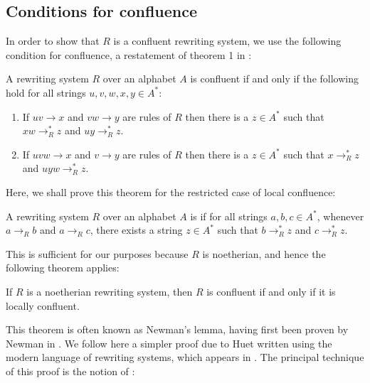 \documentclass[11pt,libertine,widepage,nosubthm]{lmaths}
\begin{document}
\subsection{Conditions for confluence}

In order to show that $R$ is a confluent rewriting system, we use the following condition for confluence, a restatement of theorem 1 in \cite{McNaughton1987}:
\begin{theorem}
	A rewriting system $R$ over an alphabet $A$ is confluent if and only if the following hold for all strings $u, v, w, x, y \in A^*$:
	\begin{enumerate}[(1)]
		\item \label{it:conf-overlap} If $uv \to x$ and $vw \to y$ are rules of $R$ then there is a $z \in A^*$ such that $xw \to^*_R z$ and $uy \to^*_R z$.
		\item \label{it:conf-middle} If $uvw \to x$ and $v \to y$ are rules of $R$ then there is a $z \in A^*$ such that $x \to^*_R z$ and $uyw \to^*_R z$.
	\end{enumerate}
\end{theorem}

Here, we shall prove this theorem for the restricted case of local confluence:

\begin{defn}
	A rewriting system $R$ over an alphabet $A$ is  if for all strings $a, b, c \in A^*$, whenever $a \to_R b$ and $a \to_R c$, there exists a string $z \in A^*$ such that $b \to^*_R z$ and $c \to^*_R z$.
\end{defn}

This is sufficient for our purposes because $R$ is noetherian, and hence the following theorem applies:

\begin{theorem}[Newman] \label{thm:newman}
	If $R$ is a noetherian rewriting system, then $R$ is confluent if and only if it is locally confluent.
\end{theorem}

This theorem is often known as Newman's lemma, having first been proven by Newman in \cite{Newman1942}. We follow here a simpler proof due to Huet written using the modern language of rewriting systems, which appears in \cite{Huet1980}. The principal technique of this proof is the notion of :
\end{document}
